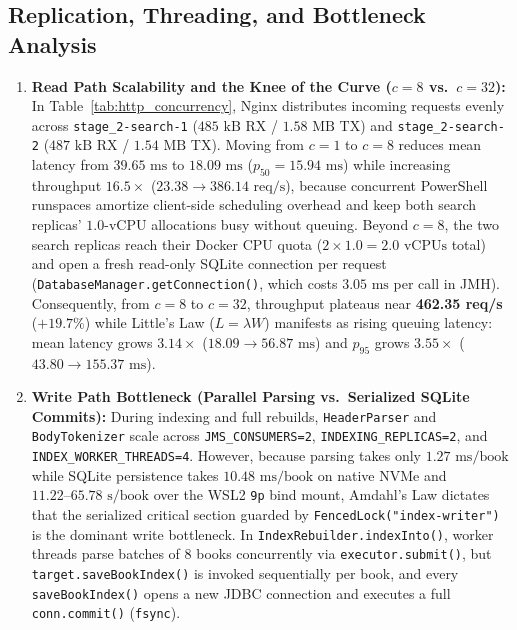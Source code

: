 \documentclass[10pt,a4paper]{article}
\begin{document}
\subsection{Replication, Threading, and Bottleneck Analysis}
\label{subsec:bottleneck_analysis}

\begin{enumerate}[leftmargin=*,nosep]
    \item \textbf{Read Path Scalability and the Knee of the Curve ($c = 8$ vs.\ $c = 32$):}
    In Table~\ref{tab:http_concurrency}, Nginx distributes incoming requests evenly across \texttt{stage\_2-search-1} ($485\text{ kB}$ RX / $1.58\text{ MB}$ TX) and \texttt{stage\_2-search-2} ($487\text{ kB}$ RX / $1.54\text{ MB}$ TX). Moving from $c=1$ to $c=8$ reduces mean latency from $39.65\text{ ms}$ to $18.09\text{ ms}$ ($p_{50} = 15.94\text{ ms}$) while increasing throughput $16.5\times$ ($23.38 \to 386.14\text{ req/s}$), because concurrent PowerShell runspaces amortize client-side scheduling overhead and keep both search replicas' $1.0\text{-vCPU}$ allocations busy without queuing. Beyond $c=8$, the two search replicas reach their Docker CPU quota ($2 \times 1.0 = 2.0\text{ vCPUs}$ total) and open a fresh read-only SQLite connection per request (\texttt{DatabaseManager.getConnection()}, which costs $3.05\text{ ms}$ per call in JMH). Consequently, from $c=8$ to $c=32$, throughput plateaus near \textbf{462.35 req/s} ($+19.7\%$) while Little's Law ($L = \lambda W$) manifests as rising queuing latency: mean latency grows $3.14\times$ ($18.09 \to 56.87\text{ ms}$) and $p_{95}$ grows $3.55\times$ ($43.80 \to 155.37\text{ ms}$).
    \item \textbf{Write Path Bottleneck (Parallel Parsing vs.\ Serialized SQLite Commits):}
    During indexing and full rebuilds, \texttt{HeaderParser} and \texttt{BodyTokenizer} scale across \texttt{JMS\_CONSUMERS=2}, \texttt{INDEXING\_REPLICAS=2}, and \texttt{INDEX\_WORKER\_THREADS=4}. However, because parsing takes only $1.27\text{ ms/book}$ while SQLite persistence takes $10.48\text{ ms/book}$ on native NVMe and $11.22\text{--}65.78\text{ s/book}$ over the WSL2 \texttt{9p} bind mount, Amdahl's Law dictates that the serialized critical section guarded by \texttt{FencedLock("index-writer")} is the dominant write bottleneck. In \texttt{IndexRebuilder.indexInto()}, worker threads parse batches of $8$ books concurrently via \texttt{executor.submit()}, but \texttt{target.saveBookIndex()} is invoked sequentially per book, and every \texttt{saveBookIndex()} opens a new JDBC connection and executes a full \texttt{conn.commit()} (\texttt{fsync}).
\end{enumerate}
\end{document}
